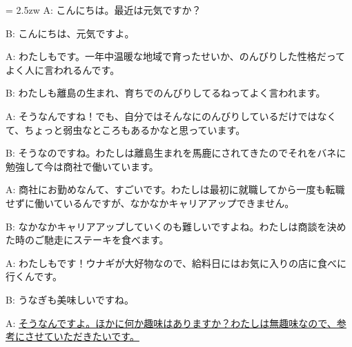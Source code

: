 \documentclass[11pt]{amsart}
\title{}
\author{}
\newenvironment{hangall}[1]{\hangindent = 2.5zw\everypar{\hangindent = 2.5zw}}{}
\begin{document}
\maketitle
\begin{hangall}{}%
A: こんにちは。最近は元気ですか？

B: こんにちは、元気ですよ。

A: わたしもです。一年中温暖な地域で育ったせいか、のんびりした性格だってよく人に言われるんです。

B: わたしも離島の生まれ、育ちでのんびりしてるねってよく言われます。

A: そうなんですね！でも、自分ではそんなにのんびりしているだけではなくて、ちょっと弱虫なところもあるかなと思っています。

B: そうなのですね。わたしは離島生まれを馬鹿にされてきたのでそれをバネに勉強して今は商社で働いています。

A: 商社にお勤めなんて、すごいです。わたしは最初に就職してから一度も転職せずに働いているんですが、なかなかキャリアアップできません。

B: なかなかキャリアアップしていくのも難しいですよね。わたしは商談を決めた時のご馳走にステーキを食べます。

A: わたしもです！ウナギが大好物なので、給料日にはお気に入りの店に食べに行くんです。

B: うなぎも美味しいですね。

A: \ul{そうなんですよ。ほかに何か趣味はありますか？わたしは無趣味なので、参考にさせていただきたいです。}\end{hangall}
\end{document}
